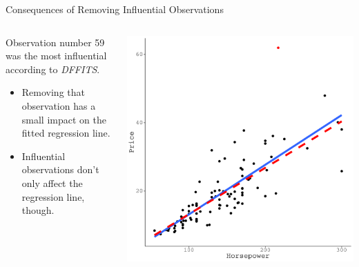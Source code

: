 \documentclass{beamer}\usepackage[]{graphicx}\usepackage[]{color}
\makeatletter
\def\maxwidth{ %
  \ifdim\Gin@nat@width>\linewidth
    \linewidth
  \else
    \Gin@nat@width
  \fi
}
\newenvironment{knitrout}{}{} %
\makeatother
\begin{document}
\begin{frame}{Consequences of Removing Influential Observations}
    
  \begin{columns}
    \begin{column}{0.5\textwidth}
      
      Observation number 59 was the most influential according to \emph{DFFITS}.
      \vb
      \begin{itemize}
      \item Removing that observation has a small impact on the fitted 
        regression line.  
        \vc
      \item Influential observations don't only affect the regression line, 
        though.
      \end{itemize}
      
    \end{column}
    
    \begin{column}{0.5\textwidth}
      
\begin{knitrout}\footnotesize
{}\color{fgcolor}

{\centering \includegraphics[width=\maxwidth]{figure/unnamed-chunk-34-1} 

}



\end{knitrout}

\end{column}
\end{columns}

\end{frame}
\end{document}
